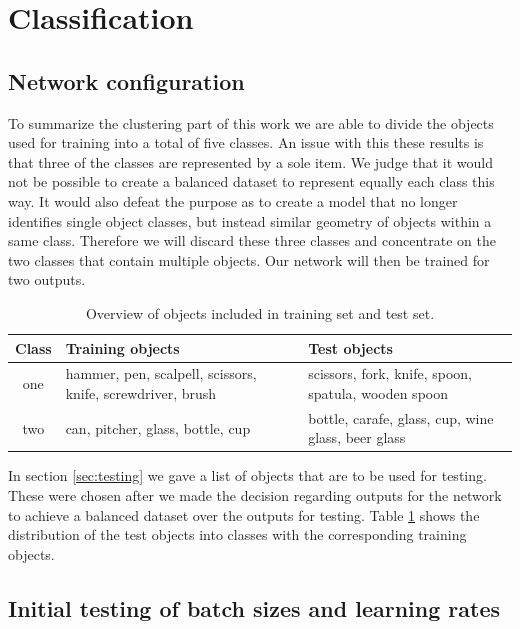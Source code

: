 \section{Classification}

\subsection{Network configuration}
\label{sec:res_setup}

To summarize the clustering part of this work we are able to divide the objects used for training into a total of five classes. An issue with this these results is that three of the classes are represented by a sole item. We judge that it would not be possible to create a balanced dataset to represent equally each class this way. It would also defeat the purpose as to create a model that no longer identifies single object classes, but instead similar geometry of objects within a same class. Therefore we will discard these three classes and concentrate on the two classes that contain multiple objects. Our network will then be trained for two outputs.

\begin{table}
	\begin{tabular}{|c|p{5cm}|p{5cm}|}
		\hline
		Class & Training objects & Test objects \\
		\hline
		one & hammer, pen, scalpell, scissors, knife, screwdriver, brush & scissors, fork, knife, spoon, spatula, wooden spoon \\
		\hline
		two & can, pitcher, glass, bottle, cup & bottle, carafe, glass, cup, wine glass, beer glass \\
		\hline
	\end{tabular}
	\caption{Overview of objects included in training set and test set.}
	\label{tab:classification_objects}
\end{table}

In section \ref{sec:testing} we gave a list of objects that are to be used for testing. These were chosen after we made the decision regarding outputs for the network to achieve a balanced dataset over the outputs for testing. Table \ref{tab:classification_objects} shows the distribution of the test objects into classes with the corresponding training objects.


\subsection{Initial testing of batch sizes and learning rates}

